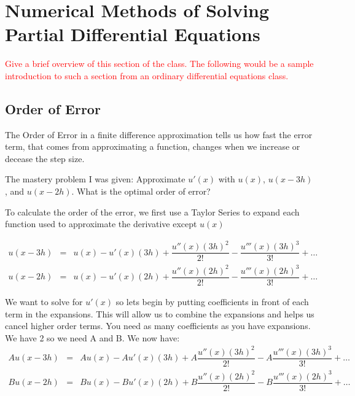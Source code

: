 \documentclass{article}
\def\ds{\displaystyle}
\def\d#1#2{\frac{d#1}{d#2}} %
\newcommand{\bea}{\begin{eqnarray*}}
\newcommand{\eea}{\end{eqnarray*}}
\newcommand{\red}[1]{\textcolor{red}{#1}}
\newcommand{\blue}[1]{\textcolor{blue}{#1}}
\begin{document}
\section{Numerical Methods of Solving Partial Differential Equations}
\red{Give a brief overview of this section of the class. The following would be a sample introduction to such a section from an ordinary differential equations class.}


\subsection{Order of Error}

The Order of Error in a finite difference approximation tells us how fast the error term, that comes from approximating a function, changes when we increase or decease the step size.\newline

The mastery problem I was given: Approximate $u'(x)$ with $u(x)$, $u(x-3h)$, and $u(x-2h)$. What is the optimal order of error? \newline

To calculate the order of the error, we first use a Taylor Series to expand each function used to approximate the derivative except $u(x)$

\bea
u(x-3h) &=& u(x) - u'(x)(3h) + \dfrac{u''(x)(3h)^2}{2!} -  \dfrac{u'''(x)(3h)^3}{3!}+\ldots \\
u(x-2h) &=& u(x) - u'(x)(2h) + \dfrac{u''(x)(2h)^2}{2!} - \dfrac{u'''(x)(2h)^3}{3!}+\ldots
\eea

We want to solve for $u'(x)$ so lets begin by putting coefficients in front of each term in the expansions. This will allow us to combine the expansions and helps us cancel higher order terms. You need as many coefficients as you have expansions. We have 2 so we need A and B.\newline
We now have: \newline
\bea
Au(x-3h) &=& Au(x) - Au'(x)(3h) + A\dfrac{u''(x)(3h)^2}{2!} -  A\dfrac{u'''(x)(3h)^3}{3!}+\ldots \\
Bu(x-2h) &=& Bu(x) - Bu'(x)(2h) + B\dfrac{u''(x)(2h)^2}{2!} - B\dfrac{u'''(x)(2h)^3}{3!}+\ldots
\eea
\end{document}
